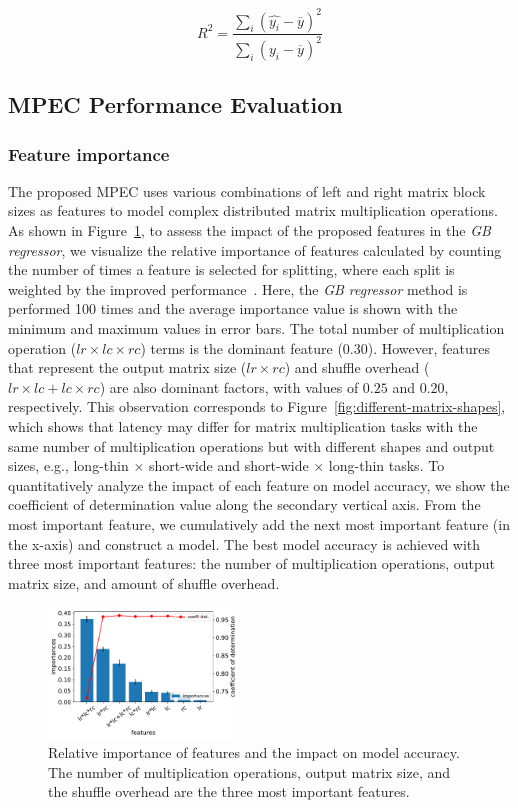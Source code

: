 \documentclass[10pt, conference, compsocconf]{IEEEtran}
\begin{document}
\begin{equation}\label{eq:cod}
  R^2 = \frac{\sum\limits_{i} (\hat{y_i}-\overline{y})^2}{\sum\limits_{i} (y_i-\overline{y})^2}
\end{equation}


\subsection{MPEC Performance Evaluation}
\subsubsection{Feature importance} The proposed MPEC uses various combinations of left and right matrix block sizes as features to model complex distributed matrix multiplication operations. As shown in Figure~\ref{fig:feature-importance}, to assess the impact of the proposed features in the \textit{GB regressor}, we visualize the relative importance of features calculated by counting the number of times a feature is selected for splitting, where each split is weighted by the improved performance~\cite{gb-feature-importance}. Here, the \textit{GB regressor} method is performed 100 times and the average importance value is shown with the minimum and maximum values in error bars. The total number of multiplication operation ($lr \times lc \times rc$) terms is the dominant feature (0.30). However, features that represent the output matrix size ($lr \times rc$) and shuffle overhead ($lr \times lc + lc \times rc$) are also dominant factors, with values of $0.25$ and $0.20$, respectively. This observation corresponds to Figure~\ref{fig:different-matrix-shapes}, which shows that latency may differ for matrix multiplication tasks with the same number of multiplication operations but with different shapes and output sizes, e.g., long-thin $\times$ short-wide and short-wide $\times$ long-thin tasks. To quantitatively analyze the impact of each feature on model accuracy, we show the coefficient of determination value along the secondary vertical axis. From the most important feature, we cumulatively add the next most important feature (in the x-axis) and construct a model. The best model accuracy is achieved with three most important features: the number of multiplication operations, output matrix size, and amount of shuffle overhead.

\begin{figure}
  \centering\includegraphics[width=0.45\textwidth]{figures/feature-importance.pdf}\caption{Relative importance of features and the impact on model accuracy. The number of multiplication operations, output matrix size, and  the shuffle overhead are the three most important features.}\label{fig:feature-importance}
\end{figure}
\end{document}
